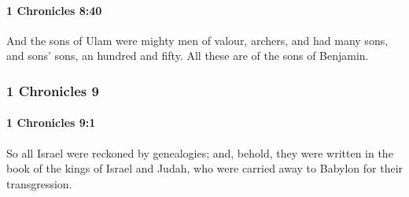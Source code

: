 		\paragraph{1 Chronicles 8:40} %
			\label{1CHRONICLES-8-40}

			And the sons of Ulam were mighty men of valour, archers, and had many sons, and sons’ sons, an hundred and fifty. All these are of the sons of Benjamin.

	\subsubsection{1 Chronicles 9} %
		\label{1CHRONICLES-9}

		\paragraph{1 Chronicles 9:1} %
			\label{1CHRONICLES-9-1}

			So all Israel were reckoned by genealogies; and, behold, they were written in the book of the kings of Israel and Judah, who were carried away to Babylon for their transgression.


